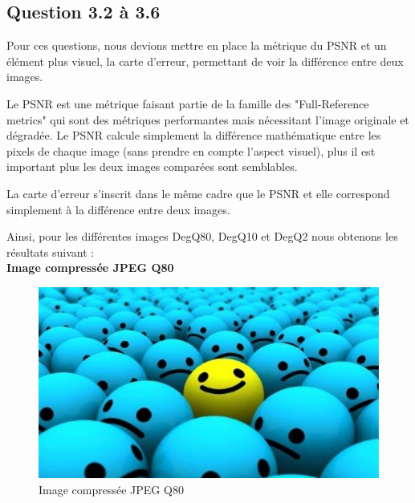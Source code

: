 \documentclass[12pt]{report}
\begin{document}
\subsection{Question 3.2 à 3.6}

Pour ces questions, nous devions mettre en place la métrique du PSNR et un élément plus visuel, la carte d'erreur, permettant de voir la différence entre deux images.

Le PSNR est une métrique faisant partie de la famille des "Full-Reference metrics" qui sont des métriques performantes mais nécessitant l'image originale et dégradée. Le PSNR calcule simplement la différence mathématique entre les pixels de chaque image (sans prendre en compte l'aspect visuel), plus il est important plus les deux images comparées sont semblables.

La carte d'erreur s'inscrit dans le même cadre que le PSNR et elle correspond simplement à la différence entre deux images.

Ainsi, pour les différentes images DegQ80, DegQ10 et DegQ2 nous obtenons les résultats suivant :\\

\newpage
\textbf{Image compressée JPEG Q80}

\begin{figure}[H]
\begin{center}
\includegraphics[scale=0.5]{../smileyDegQ80.jpg} 
\caption{Image compressée JPEG Q80 }
\end{center}
\end{figure}
\end{document}
